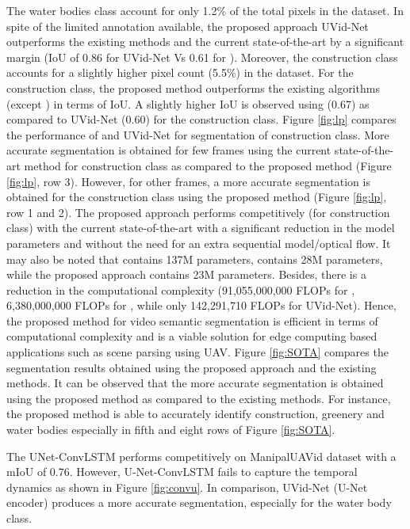 \documentclass[journal]{IEEEtran}
\begin{document}
The water bodies class account for only 1.2\% of the total pixels in the dataset. In spite of the limited annotation available, the proposed approach UVid-Net outperforms the existing methods and the current state-of-the-art \cite{22} by a significant margin (IoU of 0.86 for UVid-Net Vs 0.61 for \cite{22}). Moreover, the construction class accounts for a slightly higher pixel count (5.5\%) in the dataset. For the construction class, the proposed method outperforms the existing algorithms (except \cite{22}) in terms of IoU. A slightly higher IoU is observed using \cite{22} (0.67) as compared to UVid-Net (0.60) for the construction class. Figure \ref{fig:lp} compares the performance of \cite{22} and UVid-Net for segmentation of construction class. More accurate segmentation is obtained for few frames using the current state-of-the-art \cite{22} method for construction class as compared to the proposed method (Figure \ref{fig:lp}, row 3). However, for other frames, a more accurate segmentation is obtained for the construction class using the proposed method (Figure \ref{fig:lp}, row 1 and 2). The proposed approach performs competitively (for construction class) with the current state-of-the-art \cite{22} with a significant reduction in the model parameters and without the need for an extra sequential model/optical flow. It may also be noted that \cite{22} contains 137M parameters, \cite{hu2020temporally} contains  28M parameters, while the proposed approach contains 23M parameters.  Besides, there is a reduction in the computational complexity (91,055,000,000 FLOPs for \cite{22}, 6,380,000,000 FLOPs for \cite{hu2020temporally}, while only 142,291,710 FLOPs for UVid-Net). Hence, the proposed method for video semantic segmentation is efficient in terms of computational complexity and is a viable solution for edge computing based applications such as scene parsing using UAV. Figure \ref{fig:SOTA} compares the segmentation results obtained using the proposed approach and the existing methods. It can be observed that the more accurate segmentation is obtained using the proposed method as compared to the existing methods. For instance, the proposed method is able to accurately identify construction, greenery and water bodies especially in fifth and eight rows of Figure \ref{fig:SOTA}.
	







The UNet-ConvLSTM performs competitively on ManipalUAVid dataset with a mIoU of 0.76. 
However, U-Net-ConvLSTM fails to capture the temporal dynamics as shown in Figure \ref{fig:convu}.  In comparison, UVid-Net (U-Net encoder) produces a more accurate segmentation, especially for the water body class. 
\end{document}
